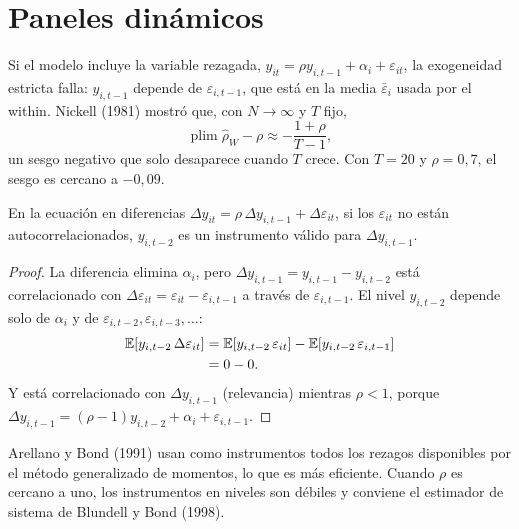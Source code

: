 \section{Paneles dinámicos}

Si el modelo incluye la variable rezagada, $y_{it}=\rho y_{i,t-1}+\alpha_i+\varepsilon_{it}$, la exogeneidad estricta falla: $y_{i,t-1}$
depende de $\varepsilon_{i,t-1}$, que está en la media $\bar\varepsilon_i$ usada por el within. Nickell (1981) mostró que, con $N\to\infty$ y
$T$ fijo,
\[
  \operatorname{plim}\hat\rho_W-\rho\approx-\frac{1+\rho}{T-1},
\]
un sesgo negativo que solo desaparece cuando $T$ crece. Con $T=20$ y $\rho=0{,}7$, el sesgo es cercano a $-0{,}09$.

\begin{proposicion}\label{prop:ah}
En la ecuación en diferencias $\Delta y_{it}=\rho\,\Delta y_{i,t-1}+\Delta\varepsilon_{it}$, si los $\varepsilon_{it}$ no están
autocorrelacionados, $y_{i,t-2}$ es un instrumento válido para $\Delta y_{i,t-1}$.
\end{proposicion}

\begin{proof}
La diferencia elimina $\alpha_i$, pero $\Delta y_{i,t-1}=y_{i,t-1}-y_{i,t-2}$ está correlacionado con $\Delta\varepsilon_{it}=\varepsilon_{it}-\varepsilon_{i,t-1}$ a
través de $\varepsilon_{i,t-1}$. El nivel $y_{i,t-2}$ depende solo de $\alpha_i$ y de $\varepsilon_{i,t-2},\varepsilon_{i,t-3},\dots$:
\begin{align*}
  \mathbb{E}[y_{i,t-2}\,\Delta\varepsilon_{it}] &= \mathbb{E}[y_{i,t-2}\,\varepsilon_{it}]-\mathbb{E}[y_{i,t-2}\,\varepsilon_{i,t-1}]\\
                                         &= 0-0 .
\end{align*}
Y está correlacionado con $\Delta y_{i,t-1}$ (relevancia) mientras $\rho<1$, porque $\Delta y_{i,t-1}=(\rho-1)y_{i,t-2}+\alpha_i+\varepsilon_{i,t-1}$.
\end{proof}

Arellano y Bond (1991) usan como instrumentos todos los rezagos disponibles por el método generalizado de momentos, lo que
es más eficiente. Cuando $\rho$ es cercano a uno, los instrumentos en niveles son débiles y conviene el estimador de sistema de
Blundell y Bond (1998).

